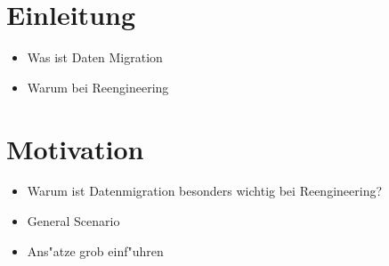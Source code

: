 \documentclass[11pt]{scrartcl}
\newif\iffull
\begin{document}
	
\iffull
\title{Data Migration} 

\subtitle{Untertitel}


\date{Modul Software Reengineering 2015/2016\\
  \small Fachbereich Informatik\\ 
  Arbeitsbereich Softwarekonstruktion \& Werkzeuge\\ 
  Universit"at Hamburg\\[4mm]
  \today}

\maketitle

\begin{abstract}
	\small\noindent\textbf{Abstract}

	\noindent Abstract 
\end{abstract}

\newpage
\tableofcontents
\newpage

\fi



\section{Einleitung}

\begin{itemize}
	\item Was ist Daten Migration
	\item Warum bei Reengineering
\end{itemize}

\section{Motivation}

\begin{itemize}
	\item Warum ist Datenmigration besonders wichtig bei Reengineering?
	\item General Scenario
	\item Ans"atze grob einf"uhren
\end{itemize}
\end{document}

